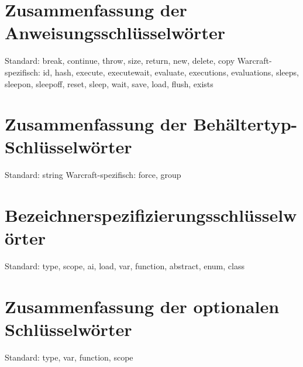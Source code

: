 \section{Zusammenfassung der Anweisungsschlüsselwörter}
Standard: break, continue, throw, size, return, new, delete, copy
Warcraft-spezifisch: id, hash, execute, executewait, evaluate, executions, evaluations, sleeps, sleepon, sleepoff, reset, sleep, wait, save, load, flush, exists

\section{Zusammenfassung der Behältertyp-Schlüsselwörter}
Standard: string
Warcraft-spezifisch: force, group

\section{Bezeichnerspezifizierungsschlüsselwörter}
Standard: type, scope, ai, load, var, function, abstract, enum, class

\section{Zusammenfassung der optionalen Schlüsselwörter}
Standard: type, var, function, scope
